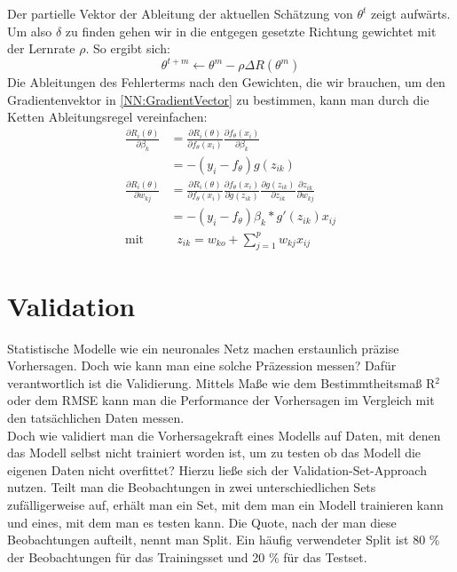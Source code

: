 \documentclass[a4paper,12pt]{thesis}
\begin{document}
Der partielle Vektor der Ableitung der aktuellen Schätzung von $\theta^t$ zeigt aufwärts. Um also $\delta$ zu finden gehen wir in die entgegen gesetzte Richtung gewichtet mit der Lernrate $\rho$. So ergibt sich:
\begin{equation}
	\label{NN:Lernfunktion}
	\theta^{t+m} \leftarrow \theta^m -\rho \Delta R(\theta^m)
\end{equation}
Die Ableitungen des Fehlerterms nach den Gewichten, die wir brauchen, um den Gradientenvektor in \ref{NN:GradientVector} zu bestimmen, kann man durch die Ketten Ableitungsregel vereinfachen:
\begin{equation}
	\label{NN:ChainRule}
	\begin{aligned}
		\frac{\partial R_i(\theta)}{\partial \beta_k}& = \frac{\partial R_i(\theta)}{\partial f_{\theta} (x_i)} \frac{\partial f_{\theta} (x_i)}{\partial \beta_k}\\
		& = -(y_i - f_{\theta})g(z_{ik})\\
		\frac{\partial R_i(\theta)}{\partial w_{kj}}& = \frac{\partial R_i(\theta)}{\partial f_{\theta} (x_i)} \frac{\partial f_{\theta} (x_i)}{\partial g(z_{ik})} \frac{\partial g(z_{ik}) }{\partial z_{ik}} \frac{\partial z_{ik}}{\partial w_{kj}}\\
		& = -(y_i - f_{\theta})\beta_k*g'(z_{ik})x_{ij}\\
		\text{mit}& \; \; z_{ik}=w_{ko}+ \sum^p_{j=1}w_{kj}x_{ij}
	\end{aligned} 
\end{equation}

\section{Validation}

Statistische Modelle wie ein neuronales Netz machen erstaunlich präzise Vorhersagen. Doch wie kann man eine solche Präzession messen? Dafür verantwortlich ist die Validierung. Mittels Maße wie dem Bestimmtheitsmaß R$^2$ oder dem RMSE kann man die Performance der Vorhersagen im Vergleich mit den tatsächlichen Daten messen.\\
Doch wie validiert man die Vorhersagekraft eines Modells auf Daten, mit denen das Modell selbst nicht trainiert worden ist, um zu testen ob das Modell die eigenen Daten nicht overfittet? Hierzu ließe sich der Validation-Set-Approach nutzen. Teilt man die Beobachtungen in zwei unterschiedlichen Sets zufälligerweise auf, erhält man ein Set, mit dem man ein Modell trainieren kann und eines, mit dem man es testen kann. Die Quote, nach der man diese Beobachtungen aufteilt, nennt man Split. Ein häufig verwendeter Split ist 80 \% der Beobachtungen für das Trainingsset und 20 \% für das Testset.
\end{document}
